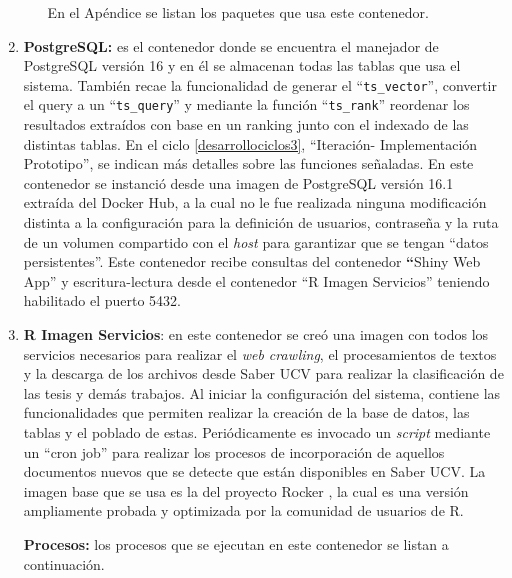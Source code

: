 \documentclass[
  12pt,
  openany]{book}
\begin{document}
\begin{enumerate}
\begin{enumerate}
    En el Apéndice se listan los paquetes que usa este contenedor.
  \end{enumerate}
\item
  \textbf{PostgreSQL:} es el contenedor donde se encuentra el manejador de PostgreSQL versión 16 y en él se almacenan todas las tablas que usa el sistema. También recae la funcionalidad de generar el ``\texttt{ts\_vector}'', convertir el query a un ``\texttt{ts\_query}'' y mediante la función ``\texttt{ts\_rank}'' reordenar los resultados extraídos con base en un ranking junto con el indexado de las distintas tablas. En el ciclo \ref{desarrollociclos3}, ``Iteración- Implementación Prototipo'', se indican más detalles sobre las funciones señaladas. En este contenedor se instanció desde una imagen de PostgreSQL versión 16.1 extraída del Docker Hub, a la cual no le fue realizada ninguna modificación distinta a la configuración para la definición de usuarios, contraseña y la ruta de un volumen compartido con el \emph{host} para garantizar que se tengan ``datos persistentes''. Este contenedor recibe consultas del contenedor \textbf{``}Shiny Web App'' y escritura-lectura desde el contenedor ``R Imagen Servicios'' teniendo habilitado el puerto 5432.
\item
  \textbf{R Imagen Servicios}: en este contenedor se creó una imagen con todos los servicios necesarios para realizar el \emph{web crawling}, el procesamientos de textos y la descarga de los archivos desde Saber UCV para realizar la clasificación de las tesis y demás trabajos. Al iniciar la configuración del sistema, contiene las funcionalidades que permiten realizar la creación de la base de datos, las tablas y el poblado de estas. Periódicamente es invocado un \emph{script} mediante un ``cron job'' para realizar los procesos de incorporación de aquellos documentos nuevos que se detecte que están disponibles en Saber UCV. La imagen base que se usa es la del proyecto Rocker \citep{RJ-2017-065:2017}, la cual es una versión ampliamente probada y optimizada por la comunidad de usuarios de R.

  \textbf{Procesos:} los procesos que se ejecutan en este contenedor se listan a continuación.


\end{enumerate}
\end{document}
